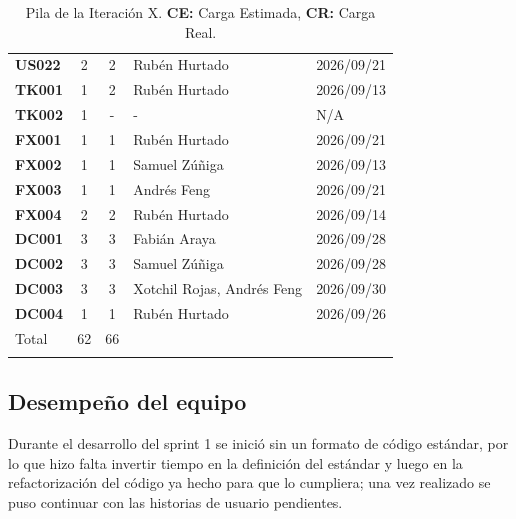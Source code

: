 \begin{longtable}{|l||c|c|p{7cm}|l|}
\textbf{US022} & 2 & 2 & Rubén Hurtado & 2026/09/21 \\
\color{ForestGreen}
\textbf{TK001} & 1 & 2 & Rubén Hurtado & 2026/09/13 \\
\color{ForestGreen}
\textbf{TK002} & 1 & - & - & N/A \\
\color{ForestGreen}
\textbf{FX001} & 1 & 1 & Rubén Hurtado & 2026/09/21 \\
\color{ForestGreen}
\textbf{FX002} & 1 & 1 & Samuel Zúñiga & 2026/09/13 \\
\color{ForestGreen}
\textbf{FX003} & 1 & 1 & Andrés Feng & 2026/09/21 \\
\color{ForestGreen}
\textbf{FX004} & 2 & 2 & Rubén Hurtado & 2026/09/14 \\
\textbf{DC001} & 3 & 3 & Fabián Araya & 2026/09/28 \\
\textbf{DC002} & 3 & 3 & Samuel Zúñiga & 2026/09/28 \\
\textbf{DC003} & 3 & 3 & Xotchil Rojas, Andrés Feng & 2026/09/30 \\
\textbf{DC004} & 1 & 1 & Rubén Hurtado & 2026/09/26 \\

\hline
Total & 62 & 66 & & \\
\hline

\caption{Pila de la Iteración X. \textbf{CE:} Carga Estimada, \textbf{CR:} Carga Real.}
\label{SprintBacklog}

\end{longtable}

\subsection{Desempeño del equipo}

Durante el desarrollo del sprint 1 se inició sin un formato de código estándar, por lo que hizo falta invertir tiempo en la definición del estándar y luego en la refactorización del código ya hecho para que lo cumpliera; una vez realizado se puso continuar con las historias de usuario pendientes. 

